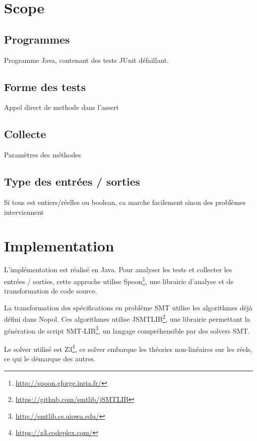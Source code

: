 \section{Scope}
\label{sec:scope}

\subsection{Programmes}

Programme Java, contenant des tests JUnit défaillant.

\subsection{Forme des tests}

Appel direct de methode dans l'assert

\subsection{Collecte}

Paramètres des méthodes


\subsection{Type des entrées / sorties}

Si tous est entiers/réelles ou boolean, ca marche facilement sinon des problèmes interviennent


\section{Implementation}
\label{sec:implementation}

\par L'implémentation est réalisé en Java. Pour analyser les tests et collecter les entrées / sorties, cette approche utilise Spoon\footnote{\url{http://spoon.gforge.inria.fr/}}, une librairie d'analyse et de transformation de code source.
\par La transformation des spécifications en problème SMT utilise les algorithmes déjà défini dans Nopol\cite{nopol}. Ces algorithmes utilise JSMTLIB\footnote{\url{https://github.com/smtlib/jSMTLIB}}, une librairie permettant la génération de script SMT-LIB\footnote{\url{http://smtlib.cs.uiowa.edu/}}, un langage compréhensible par des solvers SMT.
\par Le solver utilisé est Z3\footnote{\url{https://z3.codeplex.com/}}, ce solver embarque les théories non-linéaires sur les réels, ce qui le démarque des autres.




	

	
		
		
		